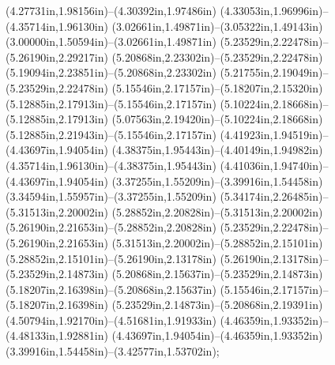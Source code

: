 (4.27731in,1.98156in)--(4.30392in,1.97486in) (4.33053in,1.96996in)--(4.35714in,1.96130in) (3.02661in,1.49871in)--(3.05322in,1.49143in) (3.00000in,1.50594in)--(3.02661in,1.49871in) (5.23529in,2.22478in)--(5.26190in,2.29217in) (5.20868in,2.23302in)--(5.23529in,2.22478in) (5.19094in,2.23851in)--(5.20868in,2.23302in) (5.21755in,2.19049in)--(5.23529in,2.22478in) (5.15546in,2.17157in)--(5.18207in,2.15320in) (5.12885in,2.17913in)--(5.15546in,2.17157in) (5.10224in,2.18668in)--(5.12885in,2.17913in) (5.07563in,2.19420in)--(5.10224in,2.18668in) (5.12885in,2.21943in)--(5.15546in,2.17157in) (4.41923in,1.94519in)--(4.43697in,1.94054in) (4.38375in,1.95443in)--(4.40149in,1.94982in) (4.35714in,1.96130in)--(4.38375in,1.95443in) (4.41036in,1.94740in)--(4.43697in,1.94054in) (3.37255in,1.55209in)--(3.39916in,1.54458in) (3.34594in,1.55957in)--(3.37255in,1.55209in) (5.34174in,2.26485in)--(5.31513in,2.20002in) (5.28852in,2.20828in)--(5.31513in,2.20002in) (5.26190in,2.21653in)--(5.28852in,2.20828in) (5.23529in,2.22478in)--(5.26190in,2.21653in) (5.31513in,2.20002in)--(5.28852in,2.15101in) (5.28852in,2.15101in)--(5.26190in,2.13178in) (5.26190in,2.13178in)--(5.23529in,2.14873in) (5.20868in,2.15637in)--(5.23529in,2.14873in) (5.18207in,2.16398in)--(5.20868in,2.15637in) (5.15546in,2.17157in)--(5.18207in,2.16398in) (5.23529in,2.14873in)--(5.20868in,2.19391in) (4.50794in,1.92170in)--(4.51681in,1.91933in) (4.46359in,1.93352in)--(4.48133in,1.92881in) (4.43697in,1.94054in)--(4.46359in,1.93352in) (3.39916in,1.54458in)--(3.42577in,1.53702in);
